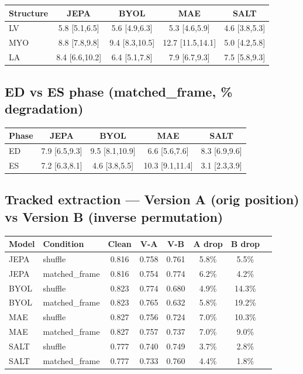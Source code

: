\documentclass{article}
\begin{document}
\begin{center}
\begin{tabular}{lcccc}
\toprule
Structure & JEPA & BYOL & MAE & SALT \\
\midrule
LV  & 5.8 [5.1,6.5] & 5.6 [4.9,6.3] & 5.3 [4.6,5.9] & 4.6 [3.8,5.3] \\
MYO & 8.8 [7.8,9.8] & 9.4 [8.3,10.5] & 12.7 [11.5,14.1] & 5.0 [4.2,5.8] \\
LA  & 8.4 [6.6,10.2] & 6.4 [5.1,7.8] & 7.9 [6.7,9.3] & 7.5 [5.8,9.3] \\
\bottomrule
\end{tabular}
\end{center}

\subsection{ED vs ES phase (matched\_frame, \% degradation)}

\begin{center}
\begin{tabular}{lcccc}
\toprule
Phase & JEPA & BYOL & MAE & SALT \\
\midrule
ED & 7.9 [6.5,9.3] & 9.5 [8.1,10.9] & 6.6 [5.6,7.6] & 8.3 [6.9,9.6] \\
ES & 7.2 [6.3,8.1] & 4.6 [3.8,5.5] & 10.3 [9.1,11.4] & 3.1 [2.3,3.9] \\
\bottomrule
\end{tabular}
\end{center}

\subsection{Tracked extraction --- Version A (orig position) vs Version B (inverse permutation)}

\begin{center}
\begin{tabular}{llcccccc}
\toprule
Model & Condition & Clean & V-A & V-B & A drop & B drop \\
\midrule
JEPA & shuffle        & 0.816 & 0.758 & 0.761 & 5.8\% & 5.5\% \\
JEPA & matched\_frame & 0.816 & 0.754 & 0.774 & 6.2\% & 4.2\% \\
BYOL & shuffle        & 0.823 & 0.774 & 0.680 & 4.9\% & 14.3\% \\
BYOL & matched\_frame & 0.823 & 0.765 & 0.632 & 5.8\% & 19.2\% \\
MAE  & shuffle        & 0.827 & 0.756 & 0.724 & 7.0\% & 10.3\% \\
MAE  & matched\_frame & 0.827 & 0.757 & 0.737 & 7.0\% & 9.0\% \\
SALT & shuffle        & 0.777 & 0.740 & 0.749 & 3.7\% & 2.8\% \\
SALT & matched\_frame & 0.777 & 0.733 & 0.760 & 4.4\% & 1.8\% \\
\bottomrule
\end{tabular}
\end{center}
\end{document}
